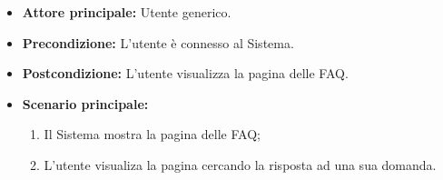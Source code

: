 \label{usecase:Visualizzazione FAQ}
\begin{itemize}
	\item \textbf{Attore principale:} Utente generico.


	\item \textbf{Precondizione:}
	      L'utente è connesso al Sistema.

	\item \textbf{Postcondizione:} L'utente visualizza la pagina delle FAQ.

	\item \textbf{Scenario principale:}
	      \begin{enumerate}
              \item Il Sistema mostra la pagina delle FAQ;
              \item L'utente visualiza la pagina cercando la risposta ad una sua domanda.
		    
	      \end{enumerate}
\end{itemize}